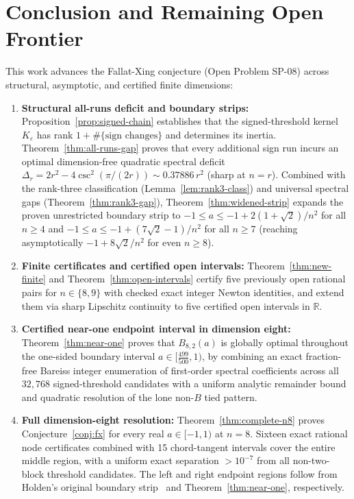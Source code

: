\documentclass[11pt,reqno]{article}
\theoremstyle{definition}
\newcommand{\R}{\mathbb{R}}
\begin{document}
\section{Conclusion and Remaining Open Frontier}

This work advances the Fallat-Xing conjecture (Open Problem SP-08) across structural, asymptotic, and certified finite dimensions:
\begin{enumerate}
    \item \textbf{Structural all-runs deficit and boundary strips:} Proposition~\ref{prop:signed-chain} establishes that the signed-threshold kernel $K_\varepsilon$ has rank $1 + \#\{\text{sign changes}\}$ and determines its inertia. Theorem~\ref{thm:all-runs-gap} proves that every additional sign run incurs an optimal dimension-free quadratic spectral deficit $\Delta_r = 2r^2 - 4\csc^2(\pi/(2r)) \sim 0.37886\, r^2$ (sharp at $n=r$). Combined with the rank-three classification (Lemma~\ref{lem:rank3-class}) and universal spectral gaps (Theorem~\ref{thm:rank3-gap}), Theorem~\ref{thm:widened-strip} expands the proven unrestricted boundary strip to $-1 \le a \le -1 + 2(1+\sqrt{2})/n^2$ for all $n \ge 4$ and $-1 \le a \le -1 + (7\sqrt{2}-1)/n^2$ for all $n \ge 7$ (reaching asymptotically $-1 + 8\sqrt{2}/n^2$ for even $n \ge 8$).
    \item \textbf{Finite certificates and certified open intervals:} Theorem~\ref{thm:new-finite} and Theorem~\ref{thm:open-intervals} certify five previously open rational pairs for $n \in \{8, 9\}$ with checked exact integer Newton identities, and extend them via sharp Lipschitz continuity to five certified open intervals in $\R$.
    \item \textbf{Certified near-one endpoint interval in dimension eight:} Theorem~\ref{thm:near-one} proves that $B_{8, 2}(a)$ is globally optimal throughout the one-sided boundary interval $a \in [\frac{499}{500}, 1)$, by combining an exact fraction-free Bareiss integer enumeration of first-order spectral coefficients across all $32{,}768$ signed-threshold candidates with a uniform analytic remainder bound and quadratic resolution of the lone non-$B$ tied pattern.
    \item \textbf{Full dimension-eight resolution:} Theorem~\ref{thm:complete-n8} proves Conjecture~\ref{conj:fx} for every real $a\in[-1,1)$ at $n=8$. Sixteen exact rational node certificates combined with 15 chord-tangent intervals cover the entire middle region, with a uniform exact separation $>10^{-7}$ from all non-two-block threshold candidates. The left and right endpoint regions follow from Holden's original boundary strip~\cite{holden2026b} and Theorem~\ref{thm:near-one}, respectively.
\end{enumerate}
\end{document}
